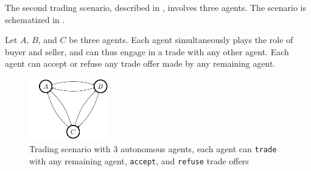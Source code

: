 


The second trading scenario, described in , involves three agents. The scenario is schematized in .

\begin{example}
\label{ex:trade3ag}
Let $A$, $B$, and $C$ be three agents. Each agent simultaneously plays the role of buyer and seller, and can thus engage in a trade with any other agent. Each agent can accept or refuse any trade offer made by any remaining agent.
\end{example}
\begin{figure}[h]
  \begin{center}
    \includegraphics[width=0.31\textwidth]{images/MasterThesistrade3agDraw (3).pdf}
  \end{center}
  \caption{Trading scenario with 3 autonomous agents, each agent can \texttt{trade} with any remaining agent, \texttt{accept}, and \texttt{refuse} trade offers}\label{fig:ex2}
\end{figure}


